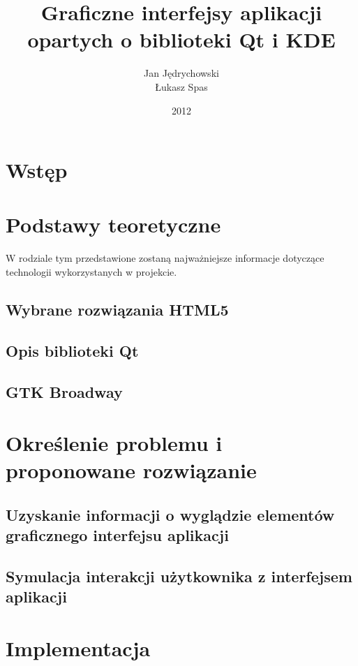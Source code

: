 \documentclass[polish]{inz}
\title{Graficzne interfejsy aplikacji opartych o biblioteki Qt i KDE}
\author{Jan Jędrychowski\\Łukasz Spas}
\date{2012}
\begin{document}
\maketitle

\chapter{Wstęp}


\chapter{Podstawy teoretyczne}
W rodziale tym przedstawione zostaną najważniejsze informacje dotyczące technologii wykorzystanych w projekcie. 

\section{Wybrane rozwiązania HTML5}


\section{Opis biblioteki Qt}


\section{GTK Broadway}


\chapter{Określenie problemu i proponowane rozwiązanie}



\section{Uzyskanie informacji o wyglądzie elementów graficznego interfejsu aplikacji}


\section{Symulacja interakcji użytkownika z interfejsem aplikacji}


\chapter{Implementacja}
\end{document}
